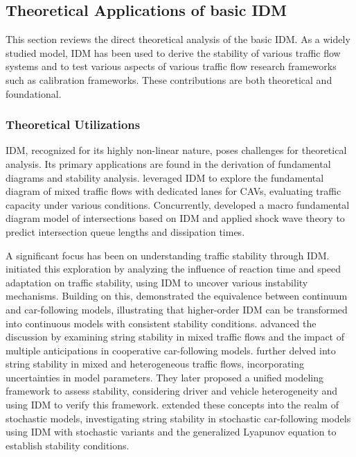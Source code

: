 \documentclass[a4paper,fleqn]{cas-sc}
\begin{document}
\subsection{Theoretical Applications of basic IDM}

This section reviews the direct theoretical analysis of the basic IDM. As a widely studied model, IDM has been used to derive the stability of various traffic flow systems and to test various aspects of various traffic flow research frameworks such as calibration frameworks. These contributions are both theoretical and foundational.


\subsubsection{Theoretical Utilizations}

IDM, recognized for its highly non-linear nature, poses challenges for theoretical analysis. Its primary applications are found in the derivation of fundamental diagrams and stability analysis. \cite{yao_modeling_2023} leveraged IDM to explore the fundamental diagram of mixed traffic flows with dedicated lanes for CAVs, evaluating traffic capacity under various conditions. Concurrently, \cite{gao_predictive_2023} developed a macro fundamental diagram model of intersections based on IDM and applied shock wave theory to predict intersection queue lengths and dissipation times.

A significant focus has been on understanding traffic stability through IDM. \cite{kestingHowReactionTimeUpdate2008} initiated this exploration by analyzing the influence of reaction time and speed adaptation on traffic stability, using IDM to uncover various instability mechanisms. Building on this, \cite{jinEquivalenceContinuumCarFollowingModels2016a} demonstrated the equivalence between continuum and car-following models, illustrating that higher-order IDM can be transformed into continuous models with consistent stability conditions. \cite{monteil_linear_2014} advanced the discussion by examining string stability in mixed traffic flows and the impact of multiple anticipations in cooperative car-following models. \cite{montaninoHomogeneousHeterogeneousTrafficFlows2021b} further delved into string stability in mixed and heterogeneous traffic flows, incorporating uncertainties in model parameters. They later proposed a unified modeling framework \citep{montaninoStringStabilityMixedHeterogeneous2021b} to assess stability, considering driver and vehicle heterogeneity and using IDM to verify this framework. \cite{bouadiStochasticFactorsStringStability2022b} extended these concepts into the realm of stochastic models, investigating string stability in stochastic car-following models using IDM with stochastic variants and the generalized Lyapunov equation to establish stability conditions.
\end{document}
